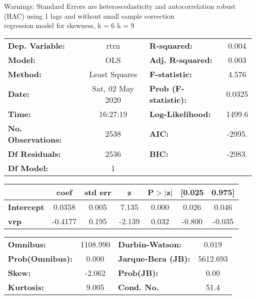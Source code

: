 Warnings: \newline
 [1] Standard Errors are heteroscedasticity and autocorrelation robust (HAC) using 1 lags and without small sample correction\\ 

regression model for skewness, k = 6 h = 9\begin{center}
\begin{tabular}{lclc}
\toprule
\textbf{Dep. Variable:}    &       rtrn       & \textbf{  R-squared:         } &     0.004   \\
\textbf{Model:}            &       OLS        & \textbf{  Adj. R-squared:    } &     0.003   \\
\textbf{Method:}           &  Least Squares   & \textbf{  F-statistic:       } &     4.576   \\
\textbf{Date:}             & Sat, 02 May 2020 & \textbf{  Prob (F-statistic):} &   0.0325    \\
\textbf{Time:}             &     16:27:19     & \textbf{  Log-Likelihood:    } &    1499.6   \\
\textbf{No. Observations:} &        2538      & \textbf{  AIC:               } &    -2995.   \\
\textbf{Df Residuals:}     &        2536      & \textbf{  BIC:               } &    -2983.   \\
\textbf{Df Model:}         &           1      & \textbf{                     } &             \\
\bottomrule
\end{tabular}
\begin{tabular}{lcccccc}
                   & \textbf{coef} & \textbf{std err} & \textbf{z} & \textbf{P$> |$z$|$} & \textbf{[0.025} & \textbf{0.975]}  \\
\midrule
\textbf{Intercept} &       0.0358  &        0.005     &     7.135  &         0.000        &        0.026    &        0.046     \\
\textbf{vrp}       &      -0.4177  &        0.195     &    -2.139  &         0.032        &       -0.800    &       -0.035     \\
\bottomrule
\end{tabular}
\begin{tabular}{lclc}
\textbf{Omnibus:}       & 1108.990 & \textbf{  Durbin-Watson:     } &    0.019  \\
\textbf{Prob(Omnibus):} &   0.000  & \textbf{  Jarque-Bera (JB):  } & 5612.693  \\
\textbf{Skew:}          &  -2.062  & \textbf{  Prob(JB):          } &     0.00  \\
\textbf{Kurtosis:}      &   9.005  & \textbf{  Cond. No.          } &     51.4  \\
\bottomrule
\end{tabular}
\end{center}

